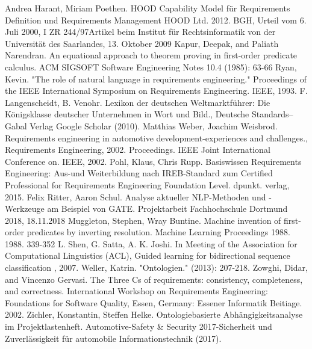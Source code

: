 \documentclass[12pt]{report}
\begin{document}
\begin{thebibliography}{20}
Andrea Harant, Miriam Poethen. \glqq HOOD Capability Model für Requirements Definition und Requirements Management \grqq{} HOOD Ltd. 2012.
BGH, \glqq Urteil vom 6. Juli 2000, I ZR 244/97\grqq Artikel beim Institut für Rechtsinformatik von der Universität des Saarlandes, 13. Oktober 2009
Kapur, Deepak, and Paliath Narendran. \glqq  An equational approach to theorem proving in first-order predicate calculus.\grqq{}  ACM SIGSOFT Software Engineering Notes 10.4 (1985): 63-66
Ryan, Kevin. "The role of natural language in requirements engineering." Proceedings of the IEEE International Symposium on Requirements Engineering. IEEE, 1993.
F. Langenscheidt, B. Venohr. \glqq Lexikon der deutschen Weltmarktführer: Die Königsklasse deutscher Unternehmen in Wort und Bild.\grqq ,  Deutsche Standards–Gabal Verlag Google Scholar (2010).
Matthias Weber, Joachim Weisbrod. \glqq Requirements engineering in automotive development-experiences and challenges.\grqq , Requirements Engineering, 2002. Proceedings. IEEE Joint International Conference on. IEEE, 2002.
 Pohl, Klaus, Chris Rupp. \glqq Basiswissen Requirements Engineering: Aus-und Weiterbildung nach IREB-Standard zum Certified Professional for Requirements Engineering Foundation Level.\grqq{} dpunkt. verlag, 2015.
Felix Ritter, Aaron Schul. \glqq Analyse aktueller NLP-Methoden und -Werkzeuge am Beispiel von GATE.\grqq{} Projektarbeit Fachhochschule Dortmund 2018, 18.11.2018
Muggleton, Stephen, Wray Buntine. \glqq  Machine invention of first-order predicates by inverting resolution.\grqq{}  Machine Learning Proceedings 1988. 1988. 339-352
 L. Shen, G. Satta, A. K. Joshi. In Meeting of the Association for Computational Linguistics (ACL), \glqq  Guided learning for bidirectional sequence classification\grqq{} , 2007.
 Weller, Katrin. "Ontologien." (2013): 207-218.
 Zowghi, Didar, and Vincenzo Gervasi. \glqq The Three Cs of requirements: consistency, completeness, and correctness.\grqq{} International Workshop on Requirements Engineering: Foundations for Software Quality, Essen, Germany: Essener Informatik Beitiage. 2002.
 Zichler, Konstantin, Steffen Helke. \glqq Ontologiebasierte Abhängigkeitsanalyse im Projektlastenheft.\grqq{} Automotive-Safety \& Security 2017-Sicherheit und Zuverlässigkeit für automobile Informationstechnik (2017).



\end{thebibliography}
\end{document}
